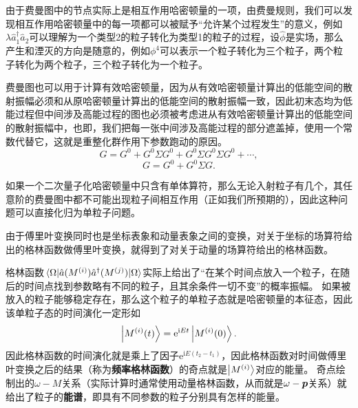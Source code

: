 \documentclass[hyperref, UTF8, a4paper]{ctexart}
\newcommand*{\ii}{\mathrm{i}}
\newcommand*{\ee}{\mathrm{e}}
\begin{document}
由于费曼图中的节点实际上是相互作用哈密顿量的一项，由费曼规则，我们可以发现相互作用哈密顿量中的每一项都可以被赋予“允许某个过程发生”的意义，例如$\lambda \hat{a}_1^\dagger \hat{a}_2$可以理解为一个类型2的粒子转化为类型1的粒子的过程，设$\hat{\phi}$是实场，那么产生和湮灭的方向是随意的，例如$\phi^4$可以表示一个粒子转化为三个粒子，两个粒子转化为两个粒子，三个粒子转化为一个粒子。%

费曼图也可以用于计算有效哈密顿量，因为从有效哈密顿量计算出的低能空间的散射振幅必须和从原哈密顿量计算出的低能空间的散射振幅一致，因此初末态均为低能过程但中间涉及高能过程的图也必须被考虑进从有效哈密顿量计算出的低能空间的散射振幅中，也即，我们把每一张中间涉及高能过程的部分遮盖掉，使用一个常数代替它，这就是重整化群作用下参数跑动的原因。
\[
    G = G^0 + G^0 \Sigma G^0 + G^0 \Sigma G^0 \Sigma G^0 + \cdots,
\]
\[
    G = G^0 + G^0 \Sigma G.
\]

如果一个二次量子化哈密顿量中只含有单体算符，那么无论入射粒子有几个，其任意阶的费曼图中都不可能出现粒子间相互作用（正如我们所预期的），因此这种问题可以直接化归为单粒子问题。


由于傅里叶变换同时也是坐标表象和动量表象之间的变换，对关于坐标的场算符给出的格林函数做傅里叶变换，就得到了对关于动量的场算符给出的格林函数。

格林函数$\mel{\Omega}{\hat{a}(M^{(i)})\hat{a}^\dagger(M^{(j)})}{\Omega}$实际上给出了“在某个时间点放入一个粒子，在随后的时间点找到参数略有不同的粒子，且其余条件一切不变”的概率振幅。
如果被放入的粒子能够稳定存在，那么这个粒子的单粒子态就是哈密顿量的本征态，因此该单粒子态的时间演化一定形如
\[
    \ket{M^{(i)}(t)} = \ee^{\ii E t} \ket{M^{(i)}(0)}.
\]
因此格林函数的时间演化就是乘上了因子$\ee^{\ii E (t_2 - t_1)}$，因此格林函数对时间做傅里叶变换之后的结果（称为\textbf{频率格林函数}）的奇点就是$\ket{M^{(i)}}$对应的能量。
奇点绘制出的$\omega-M$关系（实际计算时通常使用动量格林函数，从而就是$\omega - \vb*{p}$关系）就给出了粒子的\textbf{能谱}，即具有不同参数的粒子分别具有怎样的能量。
\end{document}
